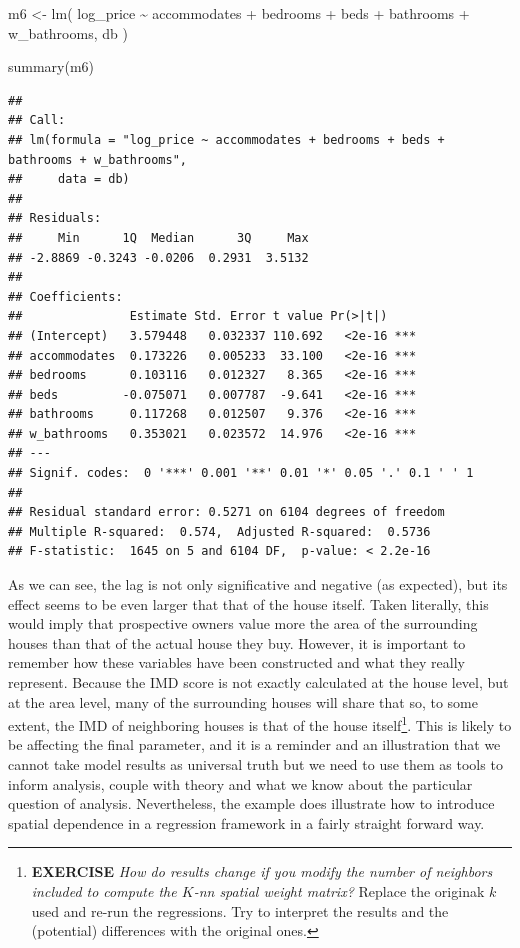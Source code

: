 \documentclass[
]{book}
\newenvironment{Shaded}{\begin{snugshade}}{\end{snugshade}}
\newcommand{\FunctionTok}[1]{\textcolor[rgb]{0.00,0.00,0.00}{#1}}
\newcommand{\NormalTok}[1]{#1}
\newcommand{\OtherTok}[1]{\textcolor[rgb]{0.56,0.35,0.01}{#1}}
\newcommand{\StringTok}[1]{\textcolor[rgb]{0.31,0.60,0.02}{#1}}
\begin{document}
\begin{Shaded}
\begin{Highlighting}[]
\NormalTok{m6 }\OtherTok{\textless{}{-}} \FunctionTok{lm}\NormalTok{(}
  \StringTok{\textquotesingle{}log\_price \textasciitilde{} accommodates + bedrooms + beds + bathrooms + w\_bathrooms\textquotesingle{}}\NormalTok{,}
\NormalTok{  db}
\NormalTok{)}

\FunctionTok{summary}\NormalTok{(m6)}
\end{Highlighting}
\end{Shaded}

\begin{verbatim}
## 
## Call:
## lm(formula = "log_price ~ accommodates + bedrooms + beds + bathrooms + w_bathrooms", 
##     data = db)
## 
## Residuals:
##     Min      1Q  Median      3Q     Max 
## -2.8869 -0.3243 -0.0206  0.2931  3.5132 
## 
## Coefficients:
##               Estimate Std. Error t value Pr(>|t|)    
## (Intercept)   3.579448   0.032337 110.692   <2e-16 ***
## accommodates  0.173226   0.005233  33.100   <2e-16 ***
## bedrooms      0.103116   0.012327   8.365   <2e-16 ***
## beds         -0.075071   0.007787  -9.641   <2e-16 ***
## bathrooms     0.117268   0.012507   9.376   <2e-16 ***
## w_bathrooms   0.353021   0.023572  14.976   <2e-16 ***
## ---
## Signif. codes:  0 '***' 0.001 '**' 0.01 '*' 0.05 '.' 0.1 ' ' 1
## 
## Residual standard error: 0.5271 on 6104 degrees of freedom
## Multiple R-squared:  0.574,  Adjusted R-squared:  0.5736 
## F-statistic:  1645 on 5 and 6104 DF,  p-value: < 2.2e-16
\end{verbatim}

As we can see, the lag is not only significative and negative (as expected), but its effect seems to be even larger that that of the house itself. Taken literally, this would imply that prospective owners value more the area of the surrounding houses than that of the actual house they buy. However, it is important to remember how these variables have been constructed and what they really represent. Because the IMD score is not exactly calculated at the house level, but at the area level, many of the surrounding houses will share that so, to some extent, the IMD of neighboring houses is that of the house itself\footnote{\textbf{EXERCISE} \emph{How do results change if you modify the number of neighbors included to compute the \(K\)-nn spatial weight matrix?} Replace the originak \(k\) used and re-run the regressions. Try to interpret the results and the (potential) differences with the original ones.}. This is likely to be affecting the final parameter, and it is a reminder and an illustration that we cannot take model results as universal truth but we need to use them as tools to inform analysis, couple with theory and what we know about the particular question of analysis. Nevertheless, the example does illustrate how to introduce spatial dependence in a regression framework in a fairly straight forward way.
\end{document}
